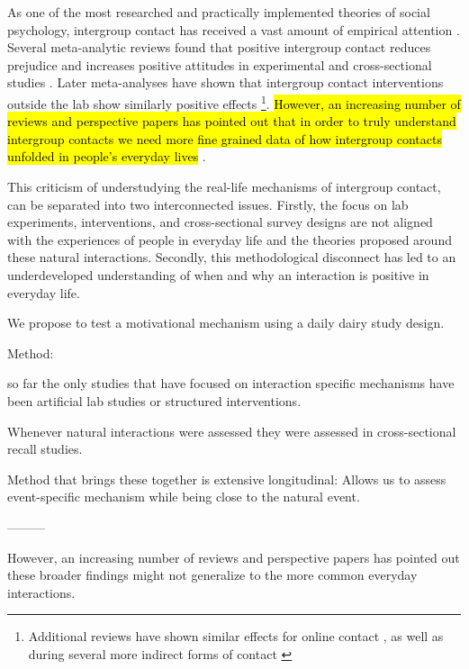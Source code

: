 As one of the most researched and practically implemented theories of social psychology, intergroup contact has received a vast amount of empirical attention \citep[][]{Dovidio2017}. Several meta-analytic reviews found that positive intergroup contact reduces prejudice and increases positive attitudes in experimental and cross-sectional studies \citep[][]{Tropp2005, Pettigrew2006, Davies2011}. Later meta-analyses have shown that intergroup contact interventions outside the lab show similarly positive effects \citep[][]{Beelmann2014, Lemmer2015}\footnote{Additional reviews have shown similar effects for online contact \citep[][]{White2020}, as well as during several more indirect forms of contact \citep[][]{Miles2014, Zhou2019, Harwood2021}}. \hl{However, an increasing number of reviews and perspective papers has pointed out that in order to truly understand intergroup contacts we need more fine grained data of how intergroup contacts unfolded in people's everyday lives} \citep[e.g.,][]{MacInnis2015}. 

This criticism of understudying the real-life mechanisms of intergroup contact, can be separated into two interconnected issues. Firstly, the focus on lab experiments, interventions, and cross-sectional survey designs are not aligned with the experiences of people in everyday life and the theories proposed around these natural interactions. Secondly, this methodological disconnect has led to an underdeveloped understanding of when and why an interaction is positive in everyday life. 

We propose to test a motivational mechanism using a daily dairy study design.



Method:

so far the only studies that have focused on interaction specific mechanisms have been artificial lab studies or structured interventions. 

Whenever natural interactions were assessed they were assessed in cross-sectional recall studies.

Method that brings these together is extensive longitudinal: Allows us to assess event-specific mechanism while being close to the natural event. 

--------- 

However, an increasing number of reviews and perspective papers has pointed out these broader findings might not generalize to the more common everyday interactions.

